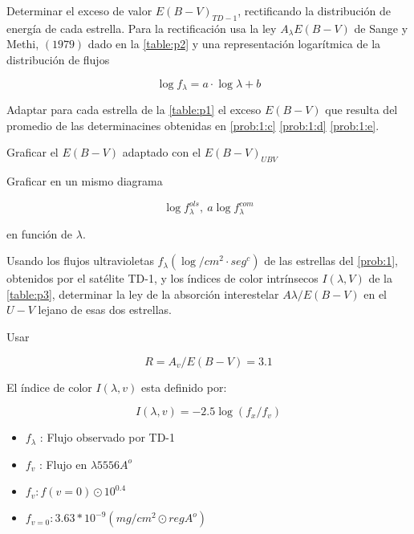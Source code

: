 \documentclass[12pt,a4paper]{practice}
\begin{document}
\begin{problem}
        \begin{ppart}\label{prob:1:e}
            Determinar el exceso de valor $E(B-V)_{TD-1}$, rectificando la distribución de energía de cada estrella. Para la rectificación usa la ley $A_{\lambda}E(B-V)$ de Sange y Methi, $(1979)$ dado en la \ref{table:p2} y una representación logarítmica de la distribución de flujos

            $$
                \log f_{\lambda} = a \cdot \log \lambda + b
            $$
        \end{ppart}

        \begin{ppart}\label{prob:1:f}
            Adaptar para cada estrella de la \ref{table:p1} el exceso $E(B-V)$ que resulta del promedio de las determinacines obtenidas en \ref{prob:1:c} \ref{prob:1:d} \ref{prob:1:e}.
        \end{ppart}

        \begin{ppart}\label{prob:1:g}
            Graficar el $E(B-V)$ adaptado con el $E(B-V)_{UBV}$
        \end{ppart}

        \begin{ppart}\label{prob:1:h}
            Graficar en un  mismo diagrama

            $$
                \log f_{\lambda} ^{ols} , \  a \log f_{\lambda} ^{com}
            $$

            en función de $\lambda$.
        \end{ppart}
    \end{problem}

    \begin{problem}\label{prob:2}
        \begin{ppart}\label{prob:2:a}
            Usando los flujos ultravioletas $f_{\lambda} (\log/cm^{2}\cdot seg^{c} )$ de las estrellas del \ref{prob:1}, obtenidos por el satélite TD-1, y los índices de color intrínsecos $I(\lambda, V)$ de la \ref{table:p3}, determinar la ley de la absorción interestelar $A{\lambda}/E(B-V)$ en el $U-V$ lejano de esas dos estrellas.

            Usar

            $$
                R= A_{v}/E(B-V)=3.1
            $$

            El índice de color $I(\lambda, v)$ esta definido por:

            $$
                I(\lambda, v)= -2.5 \log(f_{x}/f_{v})
            $$

            \begin{itemize}
                \item $f_{\lambda}$ : Flujo observado por TD-1
                \item $f_{v}$ : Flujo en $\lambda 5556 A^{o}$
                \item $f_{v}  : f(v=0) \odot 10^{0.4}$
                \item $f_{v=0}  : 3.63*10^{-9} (mg/cm^{2}\odot reg A^{o})$
            \end{itemize}
            \end{ppart}

    \end{problem}
\end{document}
